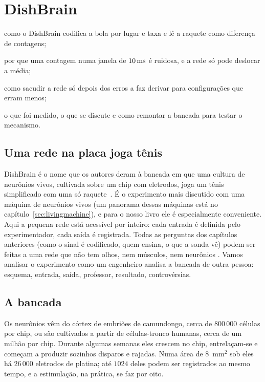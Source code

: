 \chapter{DishBrain}
\label{sec:dishbrain}
\begin{chaptergoals}
\item como o DishBrain codifica a bola por lugar e taxa e lê a raquete como diferença de contagens;
\item por que uma contagem numa janela de $10\,\text{ms}$ é ruidosa, e a rede só pode deslocar a média;
\item como sacudir a rede só depois dos erros a faz derivar para configurações que erram menos;
\item o que foi medido, o que se discute e como remontar a bancada para testar o mecanismo.
\end{chaptergoals}

\section{Uma rede na placa joga tênis}

DishBrain é o nome que os autores deram à bancada em que uma cultura de neurônios vivos, cultivada sobre um chip com eletrodos, joga um tênis simplificado com uma só raquete~\cite{Kagan2022}. É o experimento mais discutido com uma máquina de neurônios vivos (um panorama dessas máquinas está no capítulo~\ref{sec:livingmachine}), e para o nosso livro ele é especialmente conveniente. Aqui a pequena rede está acessível por inteiro: cada entrada é definida pelo experimentador, cada saída é registrada. Todas as perguntas dos capítulos anteriores (como o sinal é codificado, quem ensina, o que a sonda vê) podem ser feitas a uma rede que não tem olhos, nem músculos, nem neurônios . Vamos analisar o experimento como um engenheiro analisa a bancada de outra pessoa: esquema, entrada, saída, professor, resultado, controvérsias.

\section{A bancada}

Os neurônios vêm do córtex de embriões de camundongo, cerca de $800\,000$ células por chip, ou são cultivados a partir de células-tronco humanas, cerca de um milhão por chip. Durante algumas semanas eles crescem no chip, entrelaçam-se e começam a produzir sozinhos disparos e rajadas. Numa área de $8$~mm$^2$ sob eles há $26\,000$ eletrodos de platina; até $1024$ deles podem ser registrados ao mesmo tempo, e a estimulação, na prática, se faz por oito.

